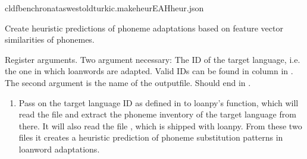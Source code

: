 \documentclass[letterpaper,10pt,english]{sphinxmanual}
\begin{document}
{{{{\begin{sphinxVerbatim}[commandchars=\\\{\}]
cldfbenchronataswestoldturkic.makeheurEAHheur.json
\end{sphinxVerbatim}
\label{\detokenize{mkloanpy:module-ronataswestoldturkiccommands.makeheur}}
\sphinxAtStartPar
Create heuristic predictions of phoneme adaptations based on feature vector
similarities of phonemes.

\begin{fulllineitems}
\label{\detokenize{mkloanpy:ronataswestoldturkiccommands.makeheur.register}}
\pysigstartsignatures
{}
\pysigstopsignatures
\sphinxAtStartPar
Register arguments. Two argument necessary: The ID of the target language,
i.e. the one in which loanwords are adapted. Valid IDs can be found in
column  in . The second argument is the name of
the output\sphinxhyphen{}file. Should end in .

\end{fulllineitems}


\begin{fulllineitems}
\label{\detokenize{mkloanpy:ronataswestoldturkiccommands.makeheur.run}}
\pysigstartsignatures
{}
\pysigstopsignatures\begin{enumerate}
%
\item {} 
\sphinxAtStartPar
Pass on the target language ID as defined in 
to loanpy’s 
function,
which will read the  file and
extract the phoneme inventory of the target language from there.
It will also read the file , which is shipped with
loanpy. From these two files it creates a heuristic prediction of
phoneme substitution patterns in loanword adaptations.


\end{enumerate}
\end{fulllineitems}}}}}
\end{document}
